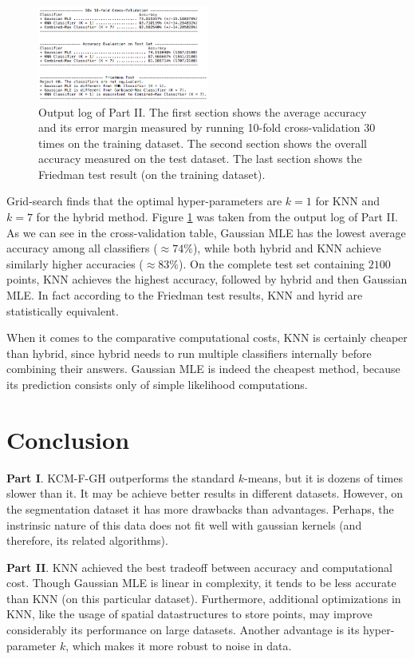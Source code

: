 \documentclass[conference]{IEEEtran}
\begin{document}
\begin{figure}
\label{part_ii_results}
\includegraphics[width=0.50\textwidth]{part_ii_results.png}
\caption{Output log of Part II. The first section shows the average accuracy and its error margin measured by running 10-fold cross-validation 30 times on the training dataset. The second section shows the overall accuracy measured on the test dataset. The last section shows the Friedman test result (on the training dataset).}
\end{figure}

Grid-search finds that the optimal hyper-parameters are $k = 1$ for KNN and $k = 7$ for the hybrid method.
Figure \ref{part_ii_results} was taken from the output log of Part II.
As we can see in the cross-validation table, Gaussian MLE has the lowest average accuracy among all classifiers ($\approx74\%$), while both hybrid and KNN achieve similarly higher accuracies ($\approx 83\%$).
On the complete test set containing $2100$ points, KNN achieves the highest accuracy, followed by hybrid and then Gaussian MLE.
In fact according to the Friedman test results, KNN and hyrid are statistically equivalent.

When it comes to the comparative computational costs, KNN is certainly cheaper than hybrid, since hybrid needs to run multiple classifiers internally before combining their answers.
Gaussian MLE is indeed the cheapest method, because its prediction consists only of simple likelihood computations.

\section{Conclusion}

\textbf{Part I}. KCM-F-GH outperforms the standard $k$-means, but it is dozens of times slower than it.
It may be achieve better results in different datasets.
However, on the segmentation dataset it has more drawbacks than advantages.
Perhaps, the instrinsic nature of this data does not fit well with gaussian kernels (and therefore, its related algorithms).

\textbf{Part II}. KNN achieved the best tradeoff between accuracy and computational cost.
Though Gaussian MLE is linear in complexity, it tends to be less accurate than KNN (on this particular dataset).
Furthermore, additional optimizations in KNN, like the usage of spatial datastructures to store points, may improve considerably its performance on large datasets.
Another advantage is its hyper-parameter $k$, which makes it more robust to noise in data.
\end{document}
